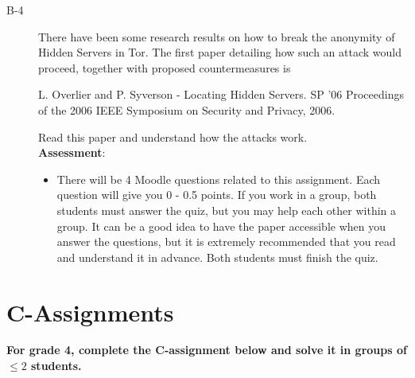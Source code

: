 \documentclass{article}
\begin{document}
\begin{description}
	\item[B-4]{There have been some research results on how to break the anonymity of Hidden Servers in Tor. The first paper detailing how such an attack would proceed, together with proposed countermeasures is 
		\begin{center}
		\begin{minipage}{0.8\textwidth}L. Overlier and P. Syverson - Locating Hidden Servers. SP '06 Proceedings of the 2006 IEEE Symposium on Security and Privacy, 2006.
		\end{minipage}
		\end{center}
		Read this paper and understand how the attacks work.\\
	\textbf{Assessment}:
	\begin{itemize}
		\item There will be 4 Moodle questions related to this assignment. Each question will give you 0 - 0.5 points. If you work in a group, both students must answer the quiz, but you may help each other within a group. It can be a good idea to have the paper accessible when you answer the questions, but it is extremely recommended that you read and understand it in advance. Both students must finish the quiz.
	\end{itemize}
	}

	

	
	
\end{description}

\clearpage

\section*{C-Assignments}
\textbf{For grade 4, complete the C-assignment below and solve it in groups of $\leq 2$ students.}
\end{document}
